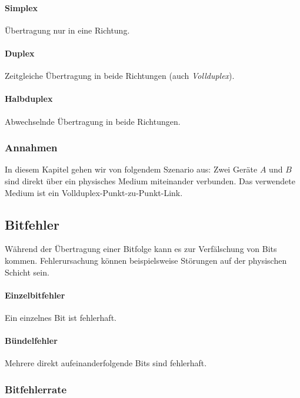 \documentclass[a4paper, 14pt]{article}
\begin{document}
	\paragraph{Simplex}

	Übertragung nur in eine Richtung.

	\paragraph{Duplex}

	Zeitgleiche Übertragung in beide Richtungen (auch \emph{Vollduplex}).

	\paragraph{Halbduplex}

	Abwechselnde Übertragung in beide Richtungen.

	\subsubsection{Annahmen}

	In diesem Kapitel gehen wir von folgendem Szenario aus:
	Zwei Geräte $A$ und $B$ sind direkt über ein physisches Medium miteinander verbunden.
	Das verwendete Medium ist ein Vollduplex-Punkt-zu-Punkt-Link.

	\subsection{Bitfehler}

	Während der Übertragung einer Bitfolge kann es zur Verfälschung von Bits kommen.
	Fehlerursachung können beispielsweise Störungen auf der physischen Schicht sein.

	\paragraph{Einzelbitfehler}

	Ein einzelnes Bit ist fehlerhaft.

	\paragraph{Bündelfehler}

	Mehrere direkt aufeinanderfolgende Bits sind fehlerhaft.

	\subsubsection{Bitfehlerrate}
\end{document}
